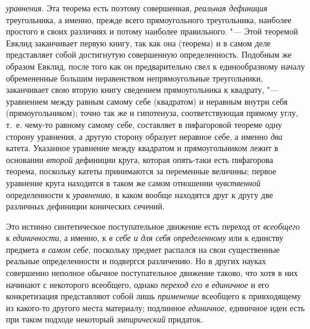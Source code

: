 {{{\em уравнения}. Эта
теорема есть поэтому совершенная,
{\em реальная дефиниция}
треугольника, а именно, прежде всего прямоугольного
треугольника, наиболее простого в своих различиях и потому наиболее
правильного. "--- Этой теоремой Евклид заканчивает первую
книгу, так как она (теорема) и в самом деле представляет собой достигнутую
совершенную определенность. Подобным же образом Евклид, после того как он
предварительно свел к единообразному
началу
обремененные большим неравенством непрямоугольные
треугольники, заканчивает свою вторую книгу сведением прямоугольника к
квадрату, "--- уравнением между равным самому себе (квадратом)
и
неравным внутри себя (прямоугольником); точно так же и
гипотенуза, соответствующая прямому углу, т.~е. чему-то равному самому
себе, составляет в пифагоровой теореме одну сторону уравнения, а другую
сторону образует неравное себе, а именно
{\em два} катета.
Указанное уравнение между квадратом и прямоугольником лежит в основании
{\em второй} дефиниции
круга, которая опять-таки есть пифагорова теорема, поскольку катеты
принимаются за переменные величины; первое уравнение круга находится в
таком же самом отношении
{\em чувственной}
определенности к
{\em уравнению}, в каком
вообще находятся друг к другу две различных дефиниции конических сечений.

Это истинно синтетическое поступательное движение есть переход
от {\em всеобщего} к
{\em единичности}, а
именно, к {\em в себе и для себя
определенному} или к единству предмета
{\em в самом себе},
поскольку предмет распался на свои существенные реальные
определенности и подвергся различению. Но в других науках совершенно
неполное обычное поступательное движение таково, что хотя в них начинают с
некоторого всеобщего, однако
{\em переход его в единичное}
и его конкретизация представляют собой лишь
{\em применение}
всеобщего к привходящему из какого-то другого места
материалу; подлинное {\em единичное},
единичное идеи есть при таком подходе некоторый
{\em эмпирический} придаток.

}}
